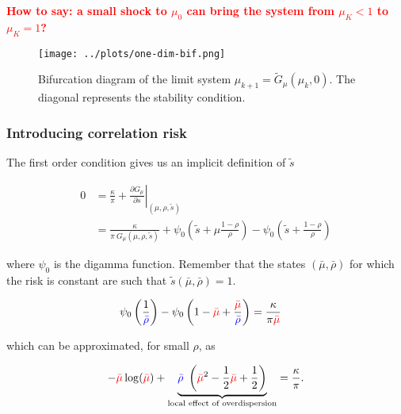 \documentclass[american, abstract=on]{scrartcl}
\theoremstyle{plain}
\newcommand\notes[1]{\textcolor{red}{\textbf{#1}}}
\begin{document}
\notes{How to say: a small shock to $\mu_0$ can bring the system from $\mu_{K} < 1$ to $\mu_K = 1$?}

\begin{figure}[H]
  \centering
  \texttt{[image: ../plots/one-dim-bif.png]}
  \caption{Bifurcation diagram of the limit system $\mu_{k + 1} = \tilde{G}_{\mu}(\mu_k, 0)$. The diagonal represents the stability condition.}
  \label{fig:one-dimensional-bifurcation}
\end{figure}

\subsubsection{Introducing correlation risk}

The first order condition gives us an implicit definition of $\tilde{s}$ 

\begin{equation}
  \begin{split}
    0 &= \frac{\kappa}{\pi} + \left. \frac{\partial G_\mu}{\partial s} \right\vert_{(\mu, \rho, \tilde{s})}  \\
    &= \frac{\kappa}{\pi \ G_\mu(\mu, \rho, \tilde{s})} + \psi_0\left(\tilde{s} + \mu \frac{1 - \rho}{\rho} \right) - \psi_0\left(\tilde{s} + \frac{1 - \rho}{\rho} \right)  
  \end{split}
\end{equation}

where $\psi_0$ is the digamma function. Remember that the states $(\bar{\mu}, \bar{\rho})$ for which the risk is constant are such that $\tilde{s}(\bar{\mu}, \bar{\rho})= 1$.

\begin{equation}
  \begin{split}
    \psi_0\left(\frac{1}{\textcolor{blue}{\bar{\rho}}} \right) - \psi_0\left(1 - \textcolor{red}{\bar{\mu}} + \frac{ \textcolor{red}{\bar{\mu}} }{\textcolor{blue}{\bar{\rho}}} \right) &= \frac{\kappa}{\pi \textcolor{red}{\bar{\mu}}}
  \end{split}
\end{equation}

which can be approximated, for small $\rho$, as

\begin{equation}
   - \textcolor{red}{\bar{\mu}}\log(\textcolor{red}{\bar{\mu}}) + \underbrace{\textcolor{blue}{\bar{\rho}} \ \left(\textcolor{red}{\bar{\mu}}^2 - \frac{1}{2}\textcolor{red}{\bar{\mu}} + \frac{1}{2}\right)}_{\text{local effect of overdispersion}} = \frac{\kappa}{\pi}.
\end{equation}
\end{document}
